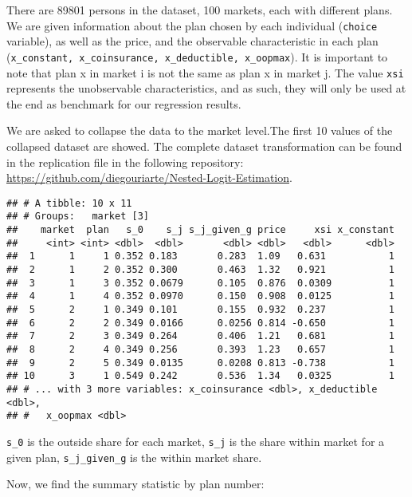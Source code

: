 \documentclass[]{article}
\begin{document}
There are 89801 persons in the dataset, 100 markets, each with different
plans. We are given information about the plan chosen by each individual
(\texttt{choice} variable), as well as the price, and the observable
characteristic in each plan
(\texttt{x\_constant,\ x\_coinsurance,\ x\_deductible,\ x\_oopmax}). It
is important to note that plan x in market i is not the same as plan x
in market j. The value \texttt{xsi} represents the unobservable
characteristics, and as such, they will only be used at the end as
benchmark for our regression results.

We are asked to collapse the data to the market level.The first 10
values of the collapsed dataset are showed. The complete dataset
transformation can be found in the replication file in the following
repository:
\url{https://github.com/diegouriarte/Nested-Logit-Estimation}.

\begin{verbatim}
## # A tibble: 10 x 11
## # Groups:   market [3]
##    market  plan   s_0    s_j s_j_given_g price     xsi x_constant
##     <int> <int> <dbl>  <dbl>       <dbl> <dbl>   <dbl>      <dbl>
##  1      1     1 0.352 0.183       0.283  1.09   0.631           1
##  2      1     2 0.352 0.300       0.463  1.32   0.921           1
##  3      1     3 0.352 0.0679      0.105  0.876  0.0309          1
##  4      1     4 0.352 0.0970      0.150  0.908  0.0125          1
##  5      2     1 0.349 0.101       0.155  0.932  0.237           1
##  6      2     2 0.349 0.0166      0.0256 0.814 -0.650           1
##  7      2     3 0.349 0.264       0.406  1.21   0.681           1
##  8      2     4 0.349 0.256       0.393  1.23   0.657           1
##  9      2     5 0.349 0.0135      0.0208 0.813 -0.738           1
## 10      3     1 0.549 0.242       0.536  1.34   0.0325          1
## # ... with 3 more variables: x_coinsurance <dbl>, x_deductible <dbl>,
## #   x_oopmax <dbl>
\end{verbatim}

\texttt{s\_0} is the outside share for each market, \texttt{s\_j} is the
share within market for a given plan, \texttt{s\_j\_given\_g} is the
within market share.

Now, we find the summary statistic by plan number:
\end{document}
